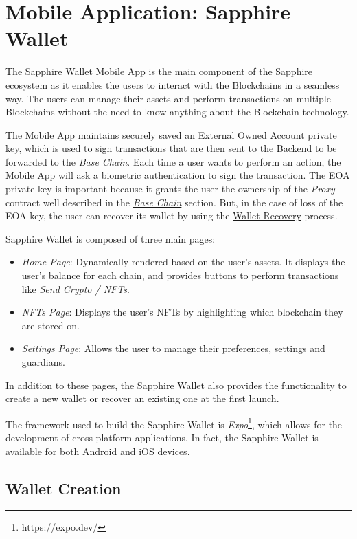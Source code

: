 \section{Mobile Application: Sapphire Wallet}
\label{sec:mobile_application}

The Sapphire Wallet Mobile App is the main component of the Sapphire ecosystem as it enables the users to interact with the Blockchains in a seamless way. The users can manage their assets and perform transactions on multiple Blockchains without the need to know anything about the Blockchain technology.

The Mobile App maintains securely saved an External Owned Account private key, which is used to sign transactions that are then sent to the \hyperref[sec:backend]{Backend} to be forwarded to the \textit{Base Chain}. Each time a user wants to perform an action, the Mobile App will ask a biometric authentication to sign the transaction. The EOA private key is important because it grants the user the ownership of the \textit{Proxy} contract well described in the \hyperref[subsec:base_chain]{\textit{Base Chain}} section. But, in the case of loss of the EOA key, the user can recover its wallet by using the \hyperref[subsec:wallet_recovery]{Wallet Recovery} process.

Sapphire Wallet is composed of three main pages:
\begin{itemize}
    \item \textit{Home Page}: Dynamically rendered based on the user's assets. It displays the user's balance for each chain, and provides buttons to perform transactions like \textit{Send Crypto / NFTs}.
    \item \textit{NFTs Page}: Displays the user's NFTs by highlighting which blockchain they are stored on.
    \item \textit{Settings Page}: Allows the user to manage their preferences, settings and guardians. 
\end{itemize}

In addition to these pages, the Sapphire Wallet also provides the functionality to create a new wallet or recover an existing one at the first launch.

The framework used to build the Sapphire Wallet is \textit{Expo}\footnote{https://expo.dev/}, which allows for the development of cross-platform applications. In fact, the Sapphire Wallet is available for both Android and iOS devices.

\subsection{Wallet Creation}
\label{subsec:wallet_creation}

